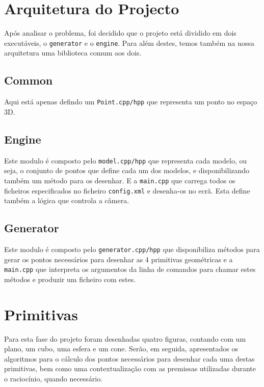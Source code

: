\documentclass[a4paper]{article}
\begin{document}
\section{Arquitetura do Projecto}
Após analisar o problema, foi decidido que o projeto está dividido em dois executáveis, o \texttt{generator} e o \texttt{engine}. Para além destes, temos também na nossa arquitetura uma biblioteca comum aos dois.

\subsection{Common}

Aqui está apenas defindo um \texttt{Point.cpp/hpp} que representa um ponto no espaço 3D.

\subsection{Engine}

Este modulo é composto pelo \texttt{model.cpp/hpp} que representa cada modelo, ou seja, o conjunto de pontos que define cada um dos modelos, e disponibilizando também um método para os desenhar. E a \texttt{main.cpp} que carrega todos os ficheiros especificados no ficheiro \texttt{config.xml} e desenha-os no ecrã. Esta define também a lógica que controla a câmera.

\subsection{Generator}

Este modulo é composto pelo \texttt{generator.cpp/hpp} que disponibiliza métodos para gerar os pontos necessários para desenhar as 4 primitivas geométricas e a \texttt{main.cpp} que interpreta os argumentos da linha de comandos para chamar estes métodos e produzir um ficheiro com estes.

\section{Primitivas}
Para esta fase do projeto foram desenhadas quatro figuras, contando com um plano, um cubo, uma esfera e um cone. Serão, em seguida, apresentados os algoritmos para o cálculo dos pontos necessários para desenhar cada uma destas primitivas, bem como uma contextualização com as premissas utilizadas durante o raciocínio, quando necessário.
\end{document}
